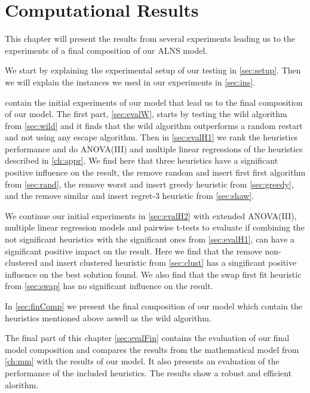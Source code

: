\documentclass[../main.tex]{subfiles}
\begin{document}
                                                
\chapter{Computational Results}
\label{ch:res}
This chapter will present the results from several experiments leading us to the experiments of a final composition of our ALNS model. \par 
We start by explaining the experimental setup of our testing in \cref{sec:setup}. Then we will explain the instances we used in our experiments in \cref{sec:ins}. \par
{} contain the initial experiments of our model that lead us to the final composition of our model. 
The first part, \cref{sec:evalW}, starts by testing the wild algorithm from \cref{sec:wild} and it finds that the wild algorithm outperforms a random restart and not using any escape algorithm.
Then in \cref{sec:evalH1} we rank the heuristics performance and do ANOVA(III) and multiple linear regressions of the heuristics described in \cref{ch:appr}. 
We find here that three heuristics have a significant positive influence on the result, the remove random and insert first first algorithm from \cref{sec:rand}, the remove worst and insert greedy heuristic from \cref{sec:greedy}, and the remove similar and insert regret-3 heuristic from \cref{sec:shaw}. \par
We continue our initial experiments in \cref{sec:evalH2} with extended ANOVA(III), multiple linear regression models and pairwise t-tests to evaluate if combining the not significant heuristics with the significant ones from \cref{sec:evalH1}, can have a significant positive impact on the result.
Here we find that the remove non-clustered and insert clustered heuristic from \cref{sec:clust} has a singificant positive influence on the best solution found. 
We also find that the swap first fit heuristic from \cref{sec:swap} has no significant influence on the result. \par
In \cref{sec:finComp} we present the final composition of our model which contain the heuristics mentioned above aswell as the wild algorithm.\par
The final part of this chapter \cref{sec:evalFin} contains the evaluation of our final model composition and compares the results from the mathematical model from \cref{ch:mm} with the results of our model. It also presents an evaluation of the performance of the included heuristics.
The results show a robust and efficient alorithm.
\end{document}
